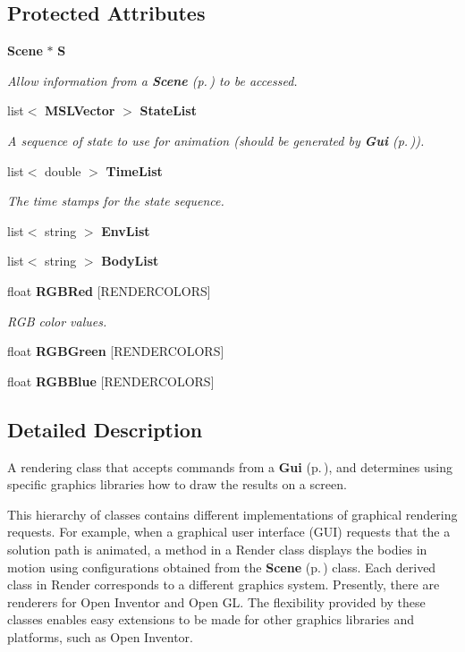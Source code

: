 \subsection*{Protected Attributes}
\begin{CompactItemize}
\item 
{\bf Scene} $\ast$ {\bf S}
\begin{CompactList}\small\item\em Allow information from a {\bf Scene} {\rm (p.\,\pageref{classScene})} to be accessed.\item\end{CompactList}\item 
list$<$ {\bf MSLVector} $>$ {\bf State\-List}
\begin{CompactList}\small\item\em A sequence of state to use for animation (should be generated by {\bf Gui} {\rm (p.\,\pageref{classGui})}).\item\end{CompactList}\item 
list$<$ double $>$ {\bf Time\-List}
\begin{CompactList}\small\item\em The time stamps for the state sequence.\item\end{CompactList}\item 
list$<$ string $>$ {\bf Env\-List}
\item 
list$<$ string $>$ {\bf Body\-List}
\item 
float {\bf RGBRed} [RENDERCOLORS]
\begin{CompactList}\small\item\em RGB color values.\item\end{CompactList}\item 
float {\bf RGBGreen} [RENDERCOLORS]
\item 
float {\bf RGBBlue} [RENDERCOLORS]
\end{CompactItemize}


\subsection{Detailed Description}
A rendering class that accepts commands from a {\bf Gui} {\rm (p.\,\pageref{classGui})}, and determines using specific graphics libraries how to draw the results on a screen.

This hierarchy of classes contains different implementations of graphical rendering requests. For example, when a graphical user interface (GUI) requests that the a solution path is animated, a method in a Render class displays the bodies in motion using configurations obtained from the {\bf Scene} {\rm (p.\,\pageref{classScene})} class. Each derived class in Render corresponds to a different graphics system. Presently, there are renderers for Open Inventor and Open GL. The flexibility provided by these classes enables easy extensions to be made for other graphics libraries and platforms, such as Open Inventor.

